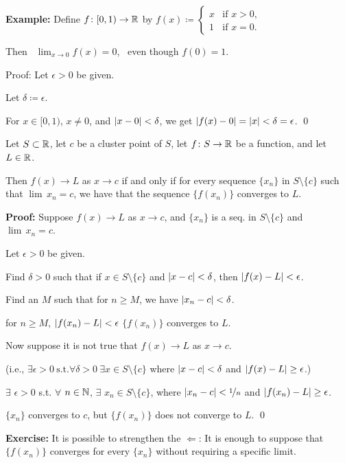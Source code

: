 \documentclass[10pt,aspectratio=149]{beamer}
\begin{document}
\begin{frame}

\textbf{Example:}
Define $f \colon [0,1) \to {\mathbb{R}}$ by
\quad
$\displaystyle
f(x) \coloneqq 
\begin{cases}
x & \text{if } x > 0 , \\
1 & \text{if } x = 0 .
\end{cases}$

\pause
\medskip

Then
~$\displaystyle\lim_{x\to 0} f(x) = 0$,~
even though $f(0) = 1$.

\pause
\medskip

Proof:  Let $\epsilon > 0$ be given.

\pause
Let $\delta \coloneqq \epsilon$.

\pause
For $x \in [0,1)$, $x \not= 0$, and $\left\lvert {x-0} \right\rvert < \delta$, we get
\quad
$\left\lvert {f(x) - 0} \right\rvert = \left\lvert {x} \right\rvert < \delta = \epsilon$.
\qed

\end{frame}

\begin{frame}
\begin{lemma}
Let $S \subset {\mathbb{R}}$, let $c$ be a cluster point of $S$, let $f \colon S \to
{\mathbb{R}}$ be a function, and let $L \in {\mathbb{R}}$.

\pause
Then
$f(x) \to L$ as $x \to c$ if and only if for every sequence $\{ x_n \}$ in
$S \setminus \{c\}$
such that $\lim\, x_n = c$,
we have that the sequence $\{ f(x_n) \}$ converges to $L$.
\end{lemma}

\pause
\textbf{Proof:}
Suppose $f(x) \to L$ as $x \to c$, and $\{ x_n \}$ is a seq. in
$S \setminus \{c\}$ and $\lim\, x_n = c$.

\pause
Let $\epsilon > 0$ be given.

\pause
Find $\delta > 0$ such that
if $x \in S \setminus \{c\}$ and $\left\lvert {x-c} \right\rvert < \delta$, then
$\left\lvert {f(x) - L} \right\rvert < \epsilon$.

\pause
Find an $M$ such that for $n \geq M$, we have $\left\lvert {x_n - c} \right\rvert < \delta$.

\pause
\thus \quad for $n \geq M$, \quad
$\left\lvert {f(x_n) - L} \right\rvert < \epsilon$
\pause
\wthus $\{ f(x_n) \}$ converges to $L$.

\pause
\medskip

Now suppose
it is not true that $f(x) \to L$ as $x \to c$.

\pause
(i.e., $\exists \epsilon > 0 ~ \text{s.t.} \forall \delta > 0 ~ \exists x \in S
\setminus \{ c \}$ where $\left\lvert {x-c} \right\rvert < \delta$ and $\left\lvert {f(x)-L} \right\rvert \geq
\epsilon$.)

\pause
\thus \quad 
$\exists$ $\epsilon > 0$ s.t. $\forall$ $n \in {\mathbb{N}}$,
$\exists$ $x_n \in S \setminus \{c\}$, where
$\left\lvert {x_n-c} \right\rvert < \nicefrac{1}{n}$ and $\left\lvert {f(x_n)-L} \right\rvert \geq \epsilon$.

\pause
$\{ x_n \}$ converges to $c$, but
$\{ f(x_n) \}$ does not converge to $L$.
\qed

\pause
\medskip

\textbf{Exercise:} It is possible to strengthen the $\Leftarrow$:
It is enough to suppose that
$\{ f(x_n) \}$ converges for every $\{ x_n \}$ without requiring a specific limit.
\end{frame}
\end{document}
